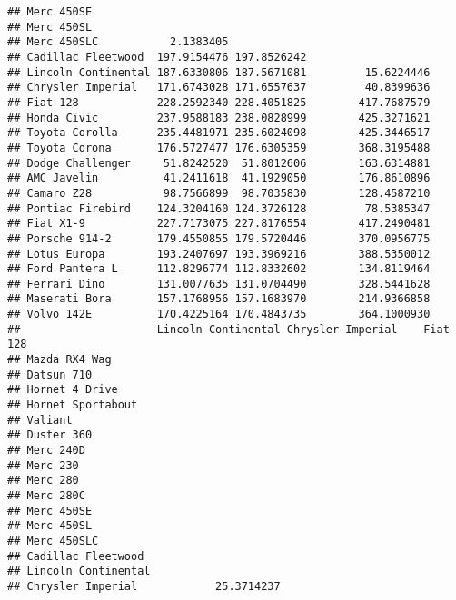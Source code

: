 \documentclass[]{book}
\begin{document}
\begin{verbatim}
## Merc 450SE                                                    
## Merc 450SL                                                    
## Merc 450SLC           2.1383405                               
## Cadillac Fleetwood  197.9154476 197.8526242                   
## Lincoln Continental 187.6330806 187.5671081         15.6224446
## Chrysler Imperial   171.6743028 171.6557637         40.8399636
## Fiat 128            228.2592340 228.4051825        417.7687579
## Honda Civic         237.9588183 238.0828999        425.3271621
## Toyota Corolla      235.4481971 235.6024098        425.3446517
## Toyota Corona       176.5727477 176.6305359        368.3195488
## Dodge Challenger     51.8242520  51.8012606        163.6314881
## AMC Javelin          41.2411618  41.1929050        176.8610896
## Camaro Z28           98.7566899  98.7035830        128.4587210
## Pontiac Firebird    124.3204160 124.3726128         78.5385347
## Fiat X1-9           227.7173075 227.8176554        417.2490481
## Porsche 914-2       179.4550855 179.5720446        370.0956775
## Lotus Europa        193.2407697 193.3969216        388.5350012
## Ford Pantera L      112.8296774 112.8332602        134.8119464
## Ferrari Dino        131.0077635 131.0704490        328.5441628
## Maserati Bora       157.1768956 157.1683970        214.9366858
## Volvo 142E          170.4225164 170.4843735        364.1000930
##                     Lincoln Continental Chrysler Imperial    Fiat 128
## Mazda RX4 Wag                                                        
## Datsun 710                                                           
## Hornet 4 Drive                                                       
## Hornet Sportabout                                                    
## Valiant                                                              
## Duster 360                                                           
## Merc 240D                                                            
## Merc 230                                                             
## Merc 280                                                             
## Merc 280C                                                            
## Merc 450SE                                                           
## Merc 450SL                                                           
## Merc 450SLC                                                          
## Cadillac Fleetwood                                                   
## Lincoln Continental                                                  
## Chrysler Imperial            25.3714237                              

\end{verbatim}
\end{document}
